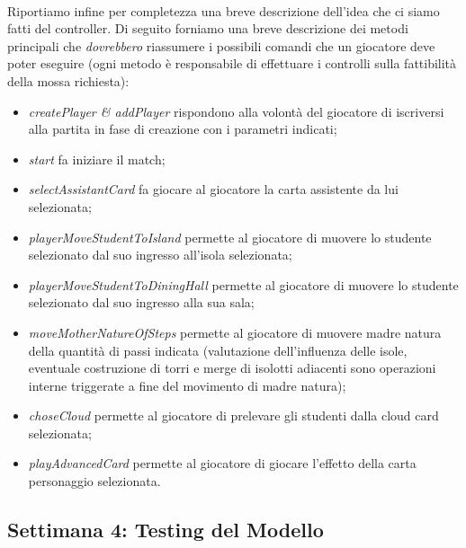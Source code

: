 \documentclass[a4paper, 12pt]{article}
\begin{document}
	\paragraph{}
	Riportiamo infine per completezza una breve descrizione dell'idea che ci siamo fatti del controller. Di seguito forniamo una breve descrizione dei metodi principali che \emph{dovrebbero} riassumere i possibili comandi che un giocatore deve poter eseguire (ogni metodo è responsabile di effettuare i controlli sulla fattibilità della mossa richiesta):
	\begin{itemize}
		\item \emph{createPlayer \& addPlayer} rispondono alla volontà del giocatore di iscriversi alla partita in fase di creazione con i parametri indicati;
		\item \emph{start} fa iniziare il match;
		\item \emph{selectAssistantCard} fa giocare al giocatore la carta assistente da lui selezionata;
		\item \emph{playerMoveStudentToIsland} permette al giocatore di muovere lo studente selezionato dal suo ingresso all'isola selezionata;
		\item \emph{playerMoveStudentToDiningHall} permette al giocatore di muovere lo studente selezionato dal suo ingresso alla sua sala;
		\item \emph{moveMotherNatureOfSteps} permette al giocatore di muovere madre natura della quantità di passi indicata (valutazione dell'influenza delle isole, eventuale costruzione di torri e merge di isolotti adiacenti sono operazioni interne triggerate a fine del movimento di madre natura);
		\item \emph{choseCloud} permette al giocatore di prelevare gli studenti dalla cloud card selezionata;
		\item \emph{playAdvancedCard} permette al giocatore di giocare l'effetto della carta personaggio selezionata.
	\end{itemize}
	
	\newpage
	\subsection{Settimana 4: Testing del Modello}
\end{document}
